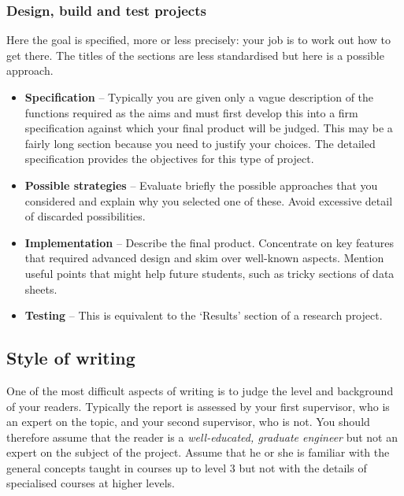 \subsubsection{Design, build and test projects}

Here the goal is specified, more or less precisely: your job is to work out how
to get there. The titles of the sections are less standardised but here is a
possible approach.

\begin{itemize}
    \item \textbf{Specification} {--} Typically you are given only a vague
          description of the functions required as the aims and must first
          develop this into a firm specification against which your final
          product will be judged. This may be a fairly long section because you
          need to justify your choices. The detailed specification provides the
          objectives for this type of project.
    \item \textbf{Possible strategies} {--} Evaluate briefly the possible
          approaches that you considered and explain why you selected one of
          these. Avoid excessive detail of discarded possibilities.
    \item \textbf{Implementation} {--} Describe the final product. Concentrate
          on key features that required advanced design and skim over well-known
          aspects. Mention useful points that might help future students, such
          as tricky sections of data sheets.
    \item \textbf{Testing} {--} This is equivalent to the ‘Results’ section of a
          research project.
\end{itemize}

\subsection{Style of writing}

One of the most difficult aspects of writing is to judge the level and
background of your readers. Typically the report is assessed by your first
supervisor, who is an expert on the topic, and your second supervisor, who is
not. You should therefore assume that the reader is a \textit{well-educated,
    graduate engineer} but not an expert on the subject of the project. Assume that
he or she is familiar with the general concepts taught in courses up to level 3
but not with the details of specialised courses at higher levels.

